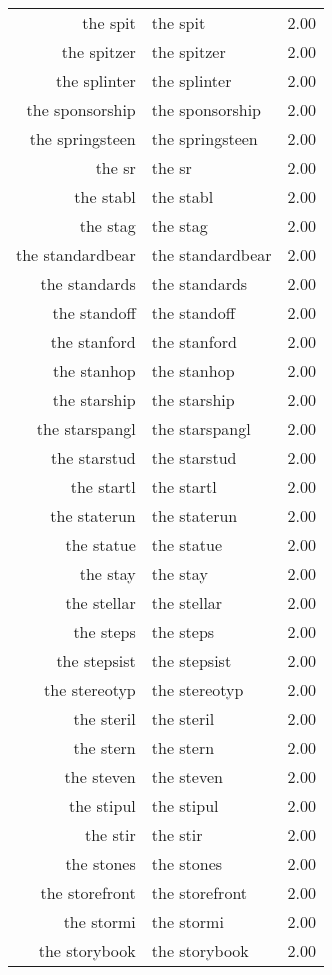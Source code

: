 \begin{table}[ht]
\begin{tabular}{rlr}
  the spit & the spit & 2.00 \\ 
  the spitzer & the spitzer & 2.00 \\ 
  the splinter & the splinter & 2.00 \\ 
  the sponsorship & the sponsorship & 2.00 \\ 
  the springsteen & the springsteen & 2.00 \\ 
  the sr & the sr & 2.00 \\ 
  the stabl & the stabl & 2.00 \\ 
  the stag & the stag & 2.00 \\ 
  the standardbear & the standardbear & 2.00 \\ 
  the standards & the standards & 2.00 \\ 
  the standoff & the standoff & 2.00 \\ 
  the stanford & the stanford & 2.00 \\ 
  the stanhop & the stanhop & 2.00 \\ 
  the starship & the starship & 2.00 \\ 
  the starspangl & the starspangl & 2.00 \\ 
  the starstud & the starstud & 2.00 \\ 
  the startl & the startl & 2.00 \\ 
  the staterun & the staterun & 2.00 \\ 
  the statue & the statue & 2.00 \\ 
  the stay & the stay & 2.00 \\ 
  the stellar & the stellar & 2.00 \\ 
  the steps & the steps & 2.00 \\ 
  the stepsist & the stepsist & 2.00 \\ 
  the stereotyp & the stereotyp & 2.00 \\ 
  the steril & the steril & 2.00 \\ 
  the stern & the stern & 2.00 \\ 
  the steven & the steven & 2.00 \\ 
  the stipul & the stipul & 2.00 \\ 
  the stir & the stir & 2.00 \\ 
  the stones & the stones & 2.00 \\ 
  the storefront & the storefront & 2.00 \\ 
  the stormi & the stormi & 2.00 \\ 
  the storybook & the storybook & 2.00 \\ 

\end{tabular}
\end{table}

